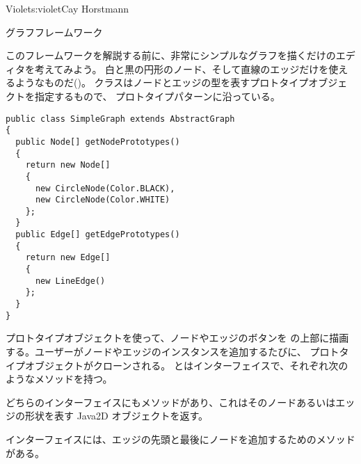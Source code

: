 \begin{aosachapter}{Violet}{s:violet}{Cay Horstmann}
\begin{aosasect1}{グラフフレームワーク}

このフレームワークを解説する前に、非常にシンプルなグラフを描くだけのエディタを考えてみよう。
白と黒の円形のノード、そして直線のエッジだけを使えるようなものだ()。
クラスはノードとエッジの型を表すプロトタイプオブジェクトを指定するもので、
プロトタイプパターンに沿っている。


\begin{verbatim}
public class SimpleGraph extends AbstractGraph
{
  public Node[] getNodePrototypes()
  {
    return new Node[] 
    {
      new CircleNode(Color.BLACK),
      new CircleNode(Color.WHITE)
    };
  }
  public Edge[] getEdgePrototypes()
  {
    return new Edge[] 
    {
      new LineEdge()
    };
  }
}
\end{verbatim}

プロトタイプオブジェクトを使って、ノードやエッジのボタンを
の上部に描画する。ユーザーがノードやエッジのインスタンスを追加するたびに、
プロトタイプオブジェクトがクローンされる。
とはインターフェイスで、それぞれ次のようなメソッドを持つ。

\begin{aosaitemize}

\item どちらのインターフェイスにもメソッドがあり、これはそのノードあるいはエッジの形状を表す
  Java2D オブジェクトを返す。

\item {}インターフェイスには、エッジの先頭と最後にノードを追加するためのメソッドがある。


\end{aosaitemize}
\end{aosasect1}
\end{aosachapter}
